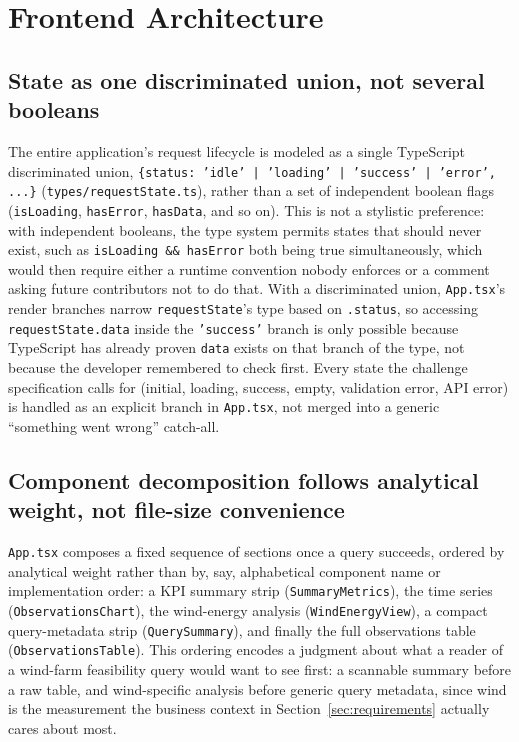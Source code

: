 \documentclass[11pt,a4paper]{article}
\begin{document}
\section{Frontend Architecture}
\label{sec:frontend}

\subsection{State as one discriminated union, not several booleans}

The entire application's request lifecycle is modeled as a single
TypeScript discriminated union,
\texttt{\{status: 'idle' | 'loading' | 'success' | 'error', ...\}}
(\texttt{types/requestState.ts}), rather than a set of independent boolean
flags (\texttt{isLoading}, \texttt{hasError}, \texttt{hasData}, and so on).
This is not a stylistic preference: with independent booleans, the type
system permits states that should never exist, such as
\texttt{isLoading \&\& hasError} both being true simultaneously, which
would then require either a runtime convention nobody enforces or a
comment asking future contributors not to do that. With a discriminated
union, \texttt{App.tsx}'s render branches narrow \texttt{requestState}'s
type based on \texttt{.status}, so accessing \texttt{requestState.data}
inside the \texttt{'success'} branch is only possible because TypeScript
has already proven \texttt{data} exists on that branch of the type, not
because the developer remembered to check first. Every state the challenge
specification calls for (initial, loading, success, empty, validation
error, API error) is handled as an explicit branch in \texttt{App.tsx},
not merged into a generic ``something went wrong'' catch-all.

\subsection{Component decomposition follows analytical weight, not file-size convenience}

\texttt{App.tsx} composes a fixed sequence of sections once a query
succeeds, ordered by analytical weight rather than by, say, alphabetical
component name or implementation order: a KPI summary strip
(\texttt{SummaryMetrics}), the time series (\texttt{ObservationsChart}),
the wind-energy analysis (\texttt{WindEnergyView}), a compact
query-metadata strip (\texttt{QuerySummary}), and finally the full
observations table (\texttt{ObservationsTable}). This ordering encodes a
judgment about what a reader of a wind-farm feasibility query would want
to see first: a scannable summary before a raw table, and wind-specific
analysis before generic query metadata, since wind is the measurement the
business context in Section~\ref{sec:requirements} actually cares about
most.
\end{document}
